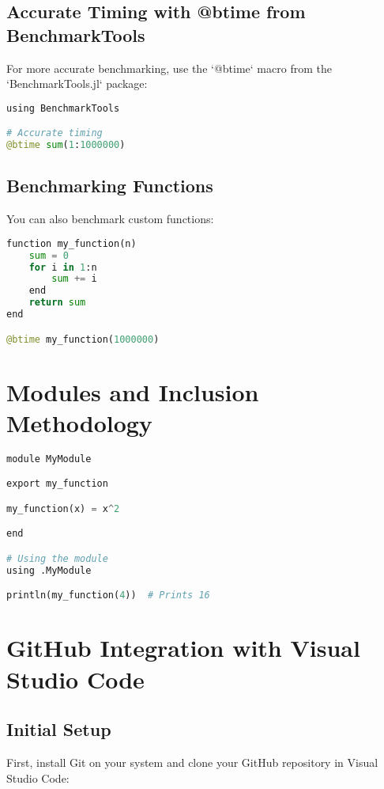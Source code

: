 \documentclass[a4paper,12pt]{article}
\begin{document}
\subsection{Accurate Timing with @btime from BenchmarkTools}

For more accurate benchmarking, use the `@btime` macro from the `BenchmarkTools.jl` package:

\begin{lstlisting}[language=Python]
using BenchmarkTools

# Accurate timing
@btime sum(1:1000000)
\end{lstlisting}

\subsection{Benchmarking Functions}
You can also benchmark custom functions:

\begin{lstlisting}[language=Python]
function my_function(n)
    sum = 0
    for i in 1:n
        sum += i
    end
    return sum
end

@btime my_function(1000000)
\end{lstlisting}

\section{Modules and Inclusion Methodology}

\begin{lstlisting}[language=Python]
module MyModule

export my_function

my_function(x) = x^2

end

# Using the module
using .MyModule

println(my_function(4))  # Prints 16
\end{lstlisting}

\section{GitHub Integration with Visual Studio Code}

\subsection{Initial Setup}

First, install Git on your system and clone your GitHub repository in Visual Studio Code:
\end{document}
